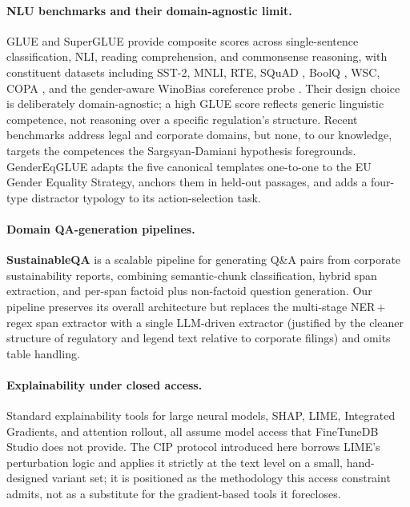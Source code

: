 \documentclass[pdflatex, sn-apa]{sn-jnl}%
\theoremstyle{thmstyleone}%
\theoremstyle{thmstyletwo}%
\theoremstyle{thmstylethree}%
\begin{document}
\paragraph{NLU benchmarks and their domain-agnostic limit.}
GLUE \citep{wang2018glue} and SuperGLUE \citep{wang2019superglue} provide
composite scores across single-sentence classification, NLI, reading
comprehension, and commonsense reasoning, with constituent datasets
including SST-2, MNLI, RTE, SQuAD \citep{rajpurkar2016squad}, BoolQ
\citep{clark2019boolq}, WSC, COPA \citep{roemmele2011copa}, and the
gender-aware WinoBias coreference probe \citep{zhao2018winobias}. Their
design choice is deliberately domain-agnostic; a high GLUE score reflects
generic linguistic competence, not reasoning over a specific regulation's
structure. Recent benchmarks address legal and corporate domains, but none,
to our knowledge, targets the competences the Sargsyan-Damiani hypothesis
foregrounds. GenderEqGLUE adapts the five canonical templates one-to-one to
the EU Gender Equality Strategy, anchors them in held-out passages, and adds
a four-type distractor typology to its action-selection task.

\paragraph{Domain QA-generation pipelines.}
\textbf{SustainableQA} \citep{wattenberg2025sustainableqa} is a scalable
pipeline for generating Q\&A pairs from corporate sustainability reports,
combining semantic-chunk classification, hybrid span extraction, and
per-span factoid plus non-factoid question generation. Our pipeline
preserves its overall architecture but replaces the multi-stage
NER\,+\,regex span extractor with a single LLM-driven extractor (justified
by the cleaner structure of regulatory and legend text relative to
corporate filings) and omits table handling.

\paragraph{Explainability under closed access.}
Standard explainability tools for large neural models, SHAP, LIME,
Integrated Gradients, and attention rollout, all assume model access that
FineTuneDB Studio does not provide. The CIP protocol introduced here
borrows LIME's perturbation logic and applies it strictly at the text level
on a small, hand-designed variant set; it is positioned as the methodology
this access constraint admits, not as a substitute for the gradient-based
tools it forecloses.
\end{document}
